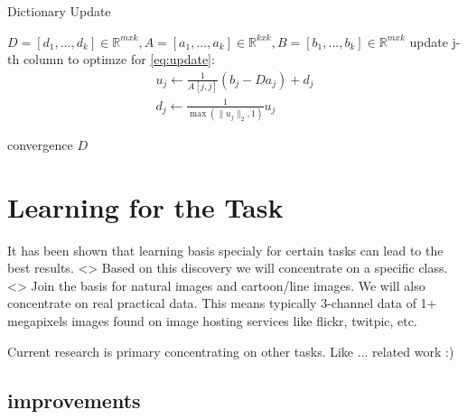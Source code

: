 \begin{algorithm}
\caption{Dictionary Update}
\label{lst:update}
\begin{algorithmic}[1]
\REQUIRE $D=[d_1,...,d_k] \in \mathbb{R}^{mxk}, A=[a_1,...,a_k] \in \mathbb{R}^{kxk}, B=[b_1,...,b_k] \in \mathbb{R}^{mxk}$
\REPEAT
{}
\STATE update j-th column to optimze for \ref{eq:update}:
\begin{align}
u_j \gets \frac{1}{A[j,j]}\left(b_j-Da_j\right)+d_j \\
d_j \gets \frac{1}{\max\left(\lVert u_j \rVert_2,1\right)} u_j
\end{align}

\ENDFOR
\UNTIL convergence 
\RETURN $D$
\end{algorithmic}
\end{algorithm}

\section{Learning for the Task}
It has been shown that learning basis specialy for certain tasks can lead to the best results\cite{}.  <>
Based on this discovery we will concentrate on a specific class. <> Join the basis for natural images and cartoon/line images.
We will also concentrate on real practical data. This means typically 3-channel data of 1+ megapixels images found on image hosting services like flickr, twitpic, etc.

Current research is primary concentrating on other tasks. 
Like ... related work :)

\subsection{improvements}

